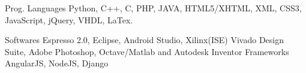 

\begin{cvhonors}

  \cvhonor
    {Prog. Languages } %
    {Python, C++, C, PHP, JAVA, HTML5/XHTML, XML, CSS3, JavaScript, jQuery, VHDL, LaTex.} %
    {} %
    {} %

  \cvhonor
    {Softwares} %
    {Espresso 2.0, Eclipse, Android Studio, Xilinx(ISE) Vivado Design Suite, Adobe Photoshop, Octave/Matlab and Autodesk Inventor} %
    {} %
    {} %
  \cvhonor
    {Frameworks} %
    {AngularJS, NodeJS, Django} %
    {} %
    {} %

\end{cvhonors}
